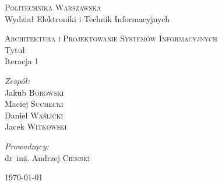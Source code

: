 \documentclass[11pt,a4paper]{article}
\begin{document}
\begin{titlepage}
  \begin{center}

    \textsc{\Large Politechnika Warszawska}\\[0.1cm]
    \small Wydział Elektroniki i Technik Informacyjnych
    \vfill

    \textsc{\small Architektura i Projektowanie Systemów Informacyjnych}\\[0.1cm]
    \Huge Tytuł\\[1.5cm]
    \small Iteracja 1\\[2.5cm]

    \vfill

    \begin{minipage}{0.4\textwidth}
      \begin{flushleft} \large
        \emph{Zespół:}\\[0.1cm]
        Jakub \textsc{Borowski}\\
        Maciej \textsc{Suchecki}\\
        Daniel \textsc{Waślicki}\\
        Jacek \textsc{Witkowski}\\
      \end{flushleft}
    \end{minipage}
    \begin{minipage}{0.4\textwidth}
      \begin{flushright} \large
        \emph{Prowadzący:}\\[0.1cm]
        dr~inż. Andrzej \textsc{Ciemski}\\[1cm]
      \end{flushright}
    \end{minipage}

    \vfill
    {\large \today}

  \end{center}
\end{titlepage}

\newpage
\tableofcontents

\newpage






\end{document}

